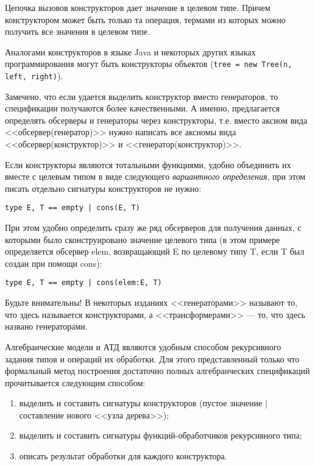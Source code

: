 Цепочка вызовов конструкторов дает значение в целевом типе. Причем конструктором может быть только та операция, термами из которых можно получить все значения в целевом типе.

Аналогами конструкторов в языке Java и некоторых других языках программирования могут быть конструкторы объектов (\texttt{tree = new Tree(n, left, right)}).

Замечено, что если удается выделить конструктор вместо генераторов, то спецификации получаются более качественными. А именно, предлагается определять обсерверы и генераторы через конструкторы, т.е. вместо аксиом вида <<обсервер(генератор)>> нужно написать все аксиомы вида <<обсервер(конструктор)>> и <<генератор(конструктор)>>.

Если конструкторы являются тотальными функциями, удобно объединить их вместе с целевым типом в виде следующего \emph{вариантного определения}, при этом писать отдельно сигнатуры конструкторов не нужно:
\begin{lstlisting}
type E, T == empty | cons(E, T)
\end{lstlisting}

При этом удобно определить сразу же ряд обсерверов для получения данных, с которыми было сконструировано значение целевого типа (в этом примере определяется обсервер elem, возвращающий E по целевому типу T, если T был создан при помощи cons):
\begin{lstlisting}
type E, T == empty | cons(elem:E, T)
\end{lstlisting}

Будьте внимательны! В некоторых изданиях <<генераторами>> называют то, что здесь называется конструкторами, а <<трансформерами>> --- то, что здесь названо генераторами.

Алгебраические модели и АТД являются удобным способом рекурсивного задания типов и операций их обработки. Для этого представленный только что формальный метод построения достаточно полных алгебраических спецификаций прочитывается следующим способом:
\begin{enumerate}
  \item выделить и составить сигнатуры конструкторов (пустое значение | составление нового <<узла дерева>>);
  \item выделить и составить сигнатуры функций-обработчиков рекурсивного типа;
  \item описать результат обработки для каждого конструктора.
\end{enumerate}

